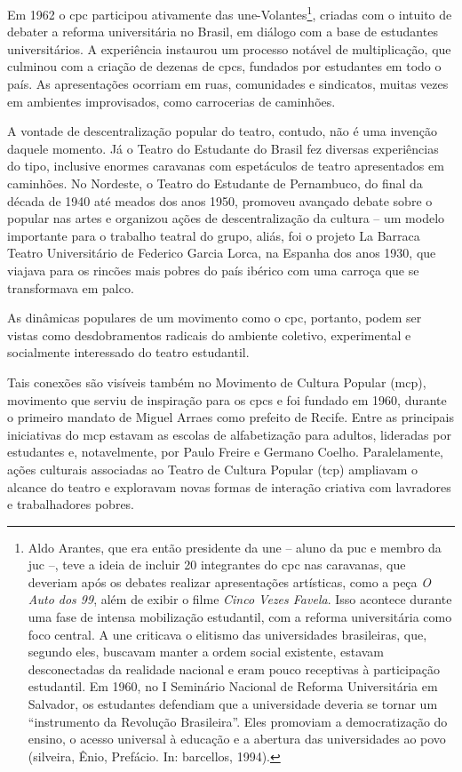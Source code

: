 Em 1962 o {\sc cpc} participou ativamente das {\sc une}-Volantes\footnote{Aldo
  Arantes, que era então presidente da {\sc une} -- aluno da {\sc puc} e membro da
  {\sc juc} --, teve a ideia de incluir 20 integrantes do {\sc cpc} nas caravanas,
  que deveriam após os debates realizar apresentações artísticas, como a
  peça {\it O Auto dos 99}, além de exibir o filme
  {\it Cinco Vezes Favela}. Isso acontece durante uma fase de intensa
  mobilização estudantil, com a reforma universitária como foco central.
  A {\sc une} criticava o elitismo das universidades brasileiras, que, segundo
  eles, buscavam manter a ordem social existente, estavam desconectadas
  da realidade nacional e eram pouco receptivas à participação
  estudantil. Em 1960, no I Seminário Nacional de Reforma Universitária
  em Salvador, os estudantes defendiam que a universidade deveria se
  tornar um “instrumento da Revolução Brasileira”. Eles promoviam a
  democratização do ensino, o acesso universal à educação e a abertura
  das universidades ao povo ({\sc silveira}, Ênio, Prefácio. In: {\sc barcellos},
  1994).}, criadas com o intuito de debater a reforma universitária no
Brasil, em diálogo com a base de estudantes universitários. A
experiência instaurou um processo notável de multiplicação, que culminou
com a criação de dezenas de {\sc cpc}s, fundados por estudantes em todo o
país. As apresentações ocorriam em ruas, comunidades e sindicatos,
muitas vezes em ambientes improvisados, como carrocerias de caminhões.

A vontade de descentralização popular do teatro, contudo, não é uma
invenção daquele momento. Já o Teatro do Estudante do Brasil fez
diversas experiências do tipo, inclusive enormes caravanas com
espetáculos de teatro apresentados em caminhões. No Nordeste, o Teatro
do Estudante de Pernambuco, do final da década de 1940 até meados dos
anos 1950, promoveu avançado debate sobre o popular nas artes e
organizou ações de descentralização da cultura -- um modelo importante
para o trabalho teatral do grupo, aliás, foi o projeto La Barraca Teatro
Universitário de Federico Garcia Lorca, na Espanha dos anos 1930, que
viajava para os rincões mais pobres do país ibérico com uma carroça que
se transformava em palco.

As dinâmicas populares de um movimento como o {\sc cpc}, portanto, podem ser
vistas como desdobramentos radicais do ambiente coletivo, experimental e
socialmente interessado do teatro estudantil.

Tais conexões são visíveis também no Movimento de Cultura Popular ({\sc mcp}),
movimento que serviu de inspiração para os {\sc cpc}s e foi fundado em 1960,
durante o primeiro mandato de Miguel Arraes como prefeito de Recife.
Entre as principais iniciativas do {\sc mcp} estavam as escolas de
alfabetização para adultos, lideradas por estudantes e, notavelmente,
por Paulo Freire e Germano Coelho. Paralelamente, ações culturais
associadas ao Teatro de Cultura Popular ({\sc tcp}) ampliavam o alcance do
teatro e exploravam novas formas de interação criativa com lavradores e
trabalhadores pobres.

